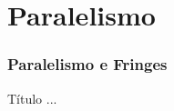 \documentclass[../main/main.tex]{subfiles}
\begin{document}
\section{Paralelismo}




\begin{frame}
	\frametitle{Paralelismo e Fringes}
\end{frame}




\begin{frame}{Título}
	...
\end{frame}
\end{document}
